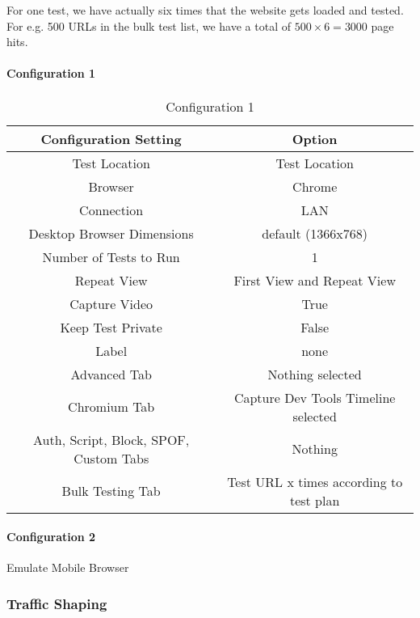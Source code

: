 For one test, we have actually six times that the website gets loaded and tested.
For e.g. 500 URLs in the bulk test list, we have a total of $500 \times 6 = 3000$ page hits.


\paragraph{Configuration 1}

\begin{table}[h]
	\caption[Test Runs]{Configuration 1}
	\label{tab:tamodelleVergleich}
	\centering
	\begin{tabular}{ |c|c| } 
	\hline
	Configuration Setting & Option \\
	\hline
	Test Location & Test Location \\ 
	Browser & Chrome \\
	\hline
	Connection & LAN \\
	Desktop Browser Dimensions & default (1366x768) \\
	Number of Tests to Run & 1 \\
	Repeat View & First View and Repeat View \\
	Capture Video & True \\
	Keep Test Private & False \\
	Label & none \\
	\hline	  
	Advanced Tab & Nothing selected \\
	Chromium Tab & Capture Dev Tools Timeline selected  \\
	Auth, Script, Block, SPOF, Custom Tabs & Nothing  \\
	Bulk Testing Tab & Test URL x times according to test plan \\
	\hline
	\end{tabular}
\end{table}

\paragraph{Configuration 2}

Emulate Mobile Browser



\subsubsection{Traffic Shaping}

